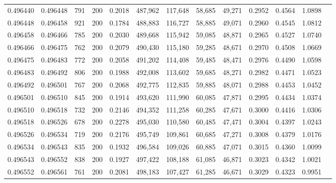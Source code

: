 \begin{tabular}{rrrrrrrrrrrrr}
0.496440 & 0.496448 &   791 & 200 &                                     0.2018 & 487,962 & 117,648 &  58,685 &  49,271 & 0.2952 & 0.4564 & 1.0898 \\
0.496448 & 0.496458 &   921 & 200 &                                     0.1784 & 488,883 & 116,727 &  58,885 &  49,071 & 0.2960 & 0.4545 & 1.0812 \\
0.496458 & 0.496466 &   785 & 200 &                                     0.2030 & 489,668 & 115,942 &  59,085 &  48,871 & 0.2965 & 0.4527 & 1.0740 \\
0.496466 & 0.496475 &   762 & 200 &                                     0.2079 & 490,430 & 115,180 &  59,285 &  48,671 & 0.2970 & 0.4508 & 1.0669 \\
0.496475 & 0.496483 &   772 & 200 &                                     0.2058 & 491,202 & 114,408 &  59,485 &  48,471 & 0.2976 & 0.4490 & 1.0598 \\
0.496483 & 0.496492 &   806 & 200 &                                     0.1988 & 492,008 & 113,602 &  59,685 &  48,271 & 0.2982 & 0.4471 & 1.0523 \\
0.496492 & 0.496501 &   767 & 200 &                                     0.2068 & 492,775 & 112,835 &  59,885 &  48,071 & 0.2988 & 0.4453 & 1.0452 \\
0.496501 & 0.496510 &   845 & 200 &                                     0.1914 & 493,620 & 111,990 &  60,085 &  47,871 & 0.2995 & 0.4434 & 1.0374 \\
0.496510 & 0.496518 &   732 & 200 &                                     0.2146 & 494,352 & 111,258 &  60,285 &  47,671 & 0.3000 & 0.4416 & 1.0306 \\
0.496518 & 0.496526 &   678 & 200 &                                     0.2278 & 495,030 & 110,580 &  60,485 &  47,471 & 0.3004 & 0.4397 & 1.0243 \\
0.496526 & 0.496534 &   719 & 200 &                                     0.2176 & 495,749 & 109,861 &  60,685 &  47,271 & 0.3008 & 0.4379 & 1.0176 \\
0.496534 & 0.496543 &   835 & 200 &                                     0.1932 & 496,584 & 109,026 &  60,885 &  47,071 & 0.3015 & 0.4360 & 1.0099 \\
0.496543 & 0.496552 &   838 & 200 &                                     0.1927 & 497,422 & 108,188 &  61,085 &  46,871 & 0.3023 & 0.4342 & 1.0021 \\
0.496552 & 0.496561 &   761 & 200 &                                     0.2081 & 498,183 & 107,427 &  61,285 &  46,671 & 0.3029 & 0.4323 & 0.9951 \\

\end{tabular}
